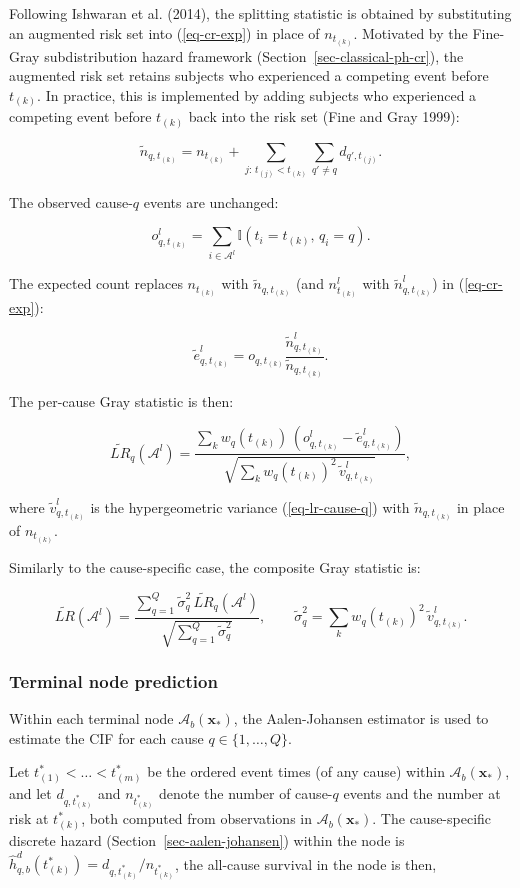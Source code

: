 \documentclass[
  letterpaper,
  krantz2]{style/krantz}
\begin{document}
Following Ishwaran et al. (2014), the splitting statistic is obtained by
substituting an augmented risk set into (\ref{eq-cr-exp}) in place of
\(n_{t_{(k)}}\). Motivated by the Fine-Gray subdistribution hazard
framework (Section~\ref{sec-classical-ph-cr}), the augmented risk set
retains subjects who experienced a competing event before \(t_{(k)}\).
In practice, this is implemented by adding subjects who experienced a
competing event before \(t_{(k)}\) back into the risk set (Fine and Gray
1999):

\[
\tilde{n}_{q,t_{(k)}} = n_{t_{(k)}} + \sum_{j:\, t_{(j)} < t_{(k)}} \sum_{q' \neq q} d_{q',t_{(j)}}.
\]

The observed cause-\(q\) events are unchanged:

\[
o^l_{q,t_{(k)}} = \sum_{i \in \mathcal{A}^l} \mathbb{I}(t_i = t_{(k)},\, q_i = q).
\]

The expected count replaces \(n_{t_{(k)}}\) with
\(\tilde{n}_{q,t_{(k)}}\) (and \(n^l_{t_{(k)}}\) with
\(\tilde{n}^l_{q,t_{(k)}}\)) in (\ref{eq-cr-exp}):

\[
\tilde{e}^l_{q,t_{(k)}} = o_{q,t_{(k)}}\frac{\tilde{n}^l_{q,t_{(k)}}}{\tilde{n}_{q,t_{(k)}}}.
\]

The per-cause Gray statistic is then:

\[
\widetilde{LR}_q(\mathcal{A}^l) = \frac{\sum_{k} w_q(t_{(k)})\,(o^l_{q,t_{(k)}} - \tilde{e}^l_{q,t_{(k)}})}{\sqrt{\sum_{k} w_q(t_{(k)})^2\,\tilde{v}^l_{q,t_{(k)}}}},
\]

where \(\tilde{v}^l_{q,t_{(k)}}\) is the hypergeometric variance
(\ref{eq-lr-cause-q}) with \(\tilde{n}_{q,t_{(k)}}\) in place of
\(n_{t_{(k)}}\).

Similarly to the cause-specific case, the composite Gray statistic is:

\[
\widetilde{LR}(\mathcal{A}^l) = \frac{\sum_{q=1}^Q \tilde{\sigma}_q^2 \, \widetilde{LR}_q(\mathcal{A}^l)}{\sqrt{\sum_{q=1}^Q \tilde{\sigma}_q^2}}, \qquad \tilde{\sigma}_q^2 = \sum_k w_q(t_{(k)})^2\,\tilde{v}^l_{q,t_{(k)}}.
\]

\subsubsection{Terminal node prediction}\label{terminal-node-prediction}

Within each terminal node \(\mathcal{A}_b(\mathbf{x}_*)\), the
Aalen-Johansen estimator is used to estimate the CIF for each cause
\(q \in \{1, \ldots, Q\}\).

Let \(t^*_{(1)} < \ldots < t^*_{(m)}\) be the ordered event times (of
any cause) within \(\mathcal{A}_b(\mathbf{x}_*)\), and let
\(d_{q,t^*_{(k)}}\) and \(n_{t^*_{(k)}}\) denote the number of
cause-\(q\) events and the number at risk at \(t^*_{(k)}\), both
computed from observations in \(\mathcal{A}_b(\mathbf{x}_*)\). The
cause-specific discrete hazard (Section~\ref{sec-aalen-johansen}) within
the node is
\(\hat{h}^d_{q,b}(t^*_{(k)}) = d_{q,t^*_{(k)}} / n_{t^*_{(k)}}\), the
all-cause survival in the node is then,
\end{document}
